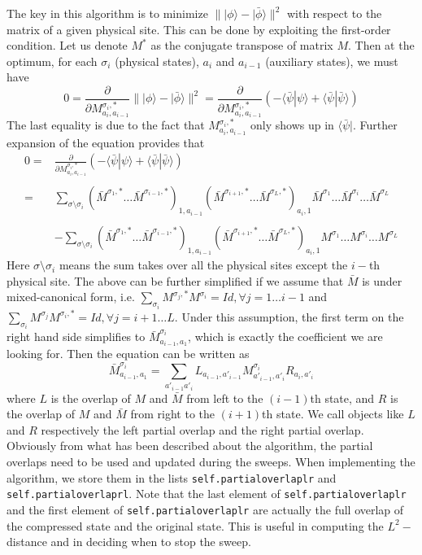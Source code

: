\documentclass[english]{article}
\begin{document}
The key in this algorithm is to minimize $\||\phi \rangle-|\bar\phi\rangle\|^2$ with respect to the matrix of a given physical site. This can be done by exploiting the first-order condition. Let us denote $M^*$ as the conjugate transpose of matrix $M$. Then at the optimum, for each $\sigma_i$ (physical states), $a_i$ and $a_{i-1}$ (auxiliary states), we must have
\[
0=\frac{\partial}{\partial M^{\sigma_i,*}_{a_i,a_{i-1}}} \||\phi \rangle-|\bar\phi\rangle\|^2 = \frac{\partial}{\partial M^{\sigma_i,*}_{a_i,a_{i-1}}} \left(-\langle\bar\psi | \psi\rangle +  \langle\bar\psi |\bar \psi\rangle \right)
\]
The last equality is due to the fact that $M^{\sigma_i,*}_{a_i,a_{i-1}}$ only shows up in $\langle\bar\psi|$. Further expansion of the equation provides that
\[
\begin{array}{rl}
0=&\displaystyle\frac{\partial}{\partial M^{\sigma_i,*}_{a_i,a_{i-1}}} \left(-\langle\bar\psi | \psi\rangle +  \langle\bar\psi |\bar \psi\rangle \right)\\\\
=&\displaystyle \sum_{\sigma\setminus\sigma_i}(\bar M^{\sigma_1,*}\dots\bar M^{\sigma_{i-1},*})_{1,a_{i-1}}(\bar M^{\sigma_{i+1},*}\dots\bar M^{\sigma_{L},*})_{a_{i},1}\bar M^{\sigma_1}\dots \bar M^{\sigma_i}\dots\bar M^{\sigma_L}\\\\
&-\displaystyle \sum_{\sigma\setminus\sigma_i}(\bar M^{\sigma_1,*}\dots\bar M^{\sigma_{i-1},*})_{1,a_{i-1}}(\bar M^{\sigma_{i+1},*}\dots\bar M^{\sigma_{L},*})_{a_{i},1} M^{\sigma_1}\dots  M^{\sigma_i}\dots M^{\sigma_L}
\end{array}
\]
Here $\sigma\setminus\sigma_i$ means the sum takes over all the physical sites except the $i-$th physical site. The above can be further simplified if we assume that $\bar M$ is under mixed-canonical form, i.e. $\sum_{\sigma_i}M^{\sigma_j,*}M^{\sigma_i}=Id, \forall j=1\dots i-1$ and $\sum_{\sigma_i}M^{\sigma_j}M^{\sigma_i,*}=Id, \forall j=i+1\dots L$. Under this assumption, the first term on the right hand side simplifies to $\bar M^{\sigma_i}_{a_{i-1},a_1}$, which is exactly the coefficient we are looking for. Then the equation can be written as
\[
\bar M^{\sigma_i}_{a_{i-1},a_1}=\sum_{a'_{i-1}a'_i}L_{a_{i-1},a'_{i-1}}M^{\sigma_i}_{a'_{i-1},a'_i}R_{a_i,a'_i}
\]
where $L$ is the overlap of $M$ and $\bar M$ from left to the $(i-1)$th state, and $R$ is the overlap of $M$ and $\bar M$ from right to the $(i+1)$th state. We call objects like $L$ and $R$ respectively the left partial overlap and the right partial overlap. Obviously from what has been described about the algorithm, the partial overlaps need to be used and updated during the sweeps. When implementing the algorithm, we store them in the lists \texttt{self.partial\textunderscore overlap\textunderscore lr} and \texttt{self.partial\textunderscore overlap\textunderscore rl}. Note that the last element of \texttt{self.partial\textunderscore overlap\textunderscore lr} and the first element of \texttt{self.partial\textunderscore overlap\textunderscore lr} are actually the full overlap of the compressed state and the original state. This is useful in computing the $L^2-$distance and in deciding when to stop the sweep.
\end{document}
